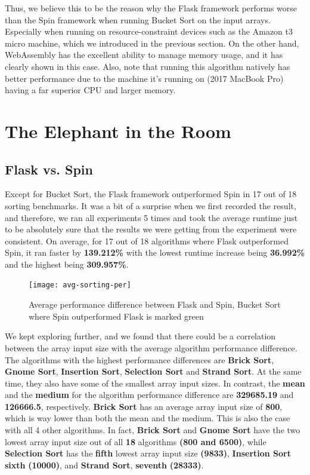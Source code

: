Thus, we believe this to be the reason why the Flask framework performs worse than the Spin framework when running Bucket Sort on the input arrays. Especially when running on resource-constraint devices such as the Amazon t3 micro machine, which we introduced in the previous section. On the other hand, WebAssembly has the excellent ability to manage memory usage, and it has clearly shown in this case. Also, note that running this algorithm natively has better performance due to the machine it's running on (2017 MacBook Pro) having a far superior CPU and larger memory.

\bigskip
\section{The Elephant in the Room}

\subsection{Flask vs. Spin}

Except for Bucket Sort, the Flask framework outperformed Spin in 17 out of 18 sorting benchmarks. It was a bit of a surprise when we first recorded the result, and therefore, we ran all experiments 5 times and took the average runtime just to be absolutely sure that the results we were getting from the experiment were consistent. On average, for 17 out of 18 algorithms where Flask outperformed Spin, it ran faster by \textbf{139.212\%} with the lowest runtime increase being \textbf{36.992\%} and the highest being \textbf{309.957\%}.

\bigskip
\begin{figure}[hp]
\centering
\texttt{[image: avg-sorting-per]}
\caption{\footnotesize{Average performance difference between Flask and Spin, Bucket Sort where Spin outperformed Flask is marked green}}
\captionsetup{aboveskip=0pt,font=it}
\end{figure}
\bigskip

We kept exploring further, and we found that there could be a correlation between the array input size with the average algorithm performance difference. The algorithms with the highest performance differences are \textbf{Brick Sort}, \textbf{Gnome Sort}, \textbf{Insertion Sort}, \textbf{Selection Sort} and \textbf{Strand Sort}. At the same time, they also have some of the smallest array input sizes. In contrast, the \textbf{mean} and the \textbf{medium} for the algorithm performance difference are \textbf{329685.19} and \textbf{126666.5}, respectively. \textbf{Brick Sort} has an average array input size of \textbf{800}, which is way lower than both the mean and the medium. This is also the case with all 4 other algorithms. In fact, \textbf{Brick Sort} and \textbf{Gnome Sort} have the two lowest array input size out of all \textbf{18} algorithms \textbf{(800 and 6500)}, while \textbf{Selection Sort} has the \textbf{fifth} lowest array input size \textbf{(9833)}, \textbf{Insertion Sort} \textbf{sixth} \textbf{(10000)}, and \textbf{Strand Sort}, \textbf{seventh} \textbf{(28333)}.

